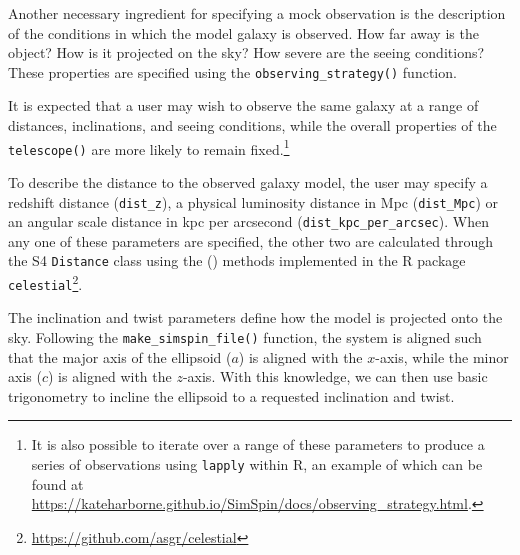 \documentclass[
  journal=pasa,
  manuscript=research-paper, %
  year=2020,
  volume=37,
]{cup-journal}
\newcommand{\citetoggle}[1]{\citeauthor{#1} (\citeyear{#1})}
\newcommand{\makesimspinfile}[1]{\texttt{make\_simspin\_file()}#1}
\newcommand{\telescope}[1]{\texttt{telescope()}#1}
\newcommand{\observingstrategy}[1]{\texttt{observing\_strategy()}#1}
\begin{document}
Another necessary ingredient for specifying a mock observation is the description of the conditions in which the model galaxy is observed.
How far away is the object? 
How is it projected on the sky? 
How severe are the seeing conditions?
These properties are specified using the \observingstrategy{} function. 

It is expected that a user may wish to observe the same galaxy at a range of distances, inclinations, and seeing conditions, while the overall properties of the \telescope{} are more likely to remain fixed.\footnote{It is also possible to iterate over a range of these parameters to produce a series of observations using \texttt{lapply} within R, an example of which can be found at \url{https://kateharborne.github.io/SimSpin/docs/observing_strategy.html}.}

To describe the distance to the observed galaxy model, the user may specify a redshift distance (\texttt{dist\_z}), a physical luminosity distance in Mpc (\texttt{dist\_Mpc}) or an angular scale distance in kpc per arcsecond (\texttt{dist\_kpc\_per\_arcsec}).
When any one of these parameters are specified, the other two are calculated through the S4 \texttt{Distance} class using the  \citetoggle{Hogg1999DistanceCosmology} methods implemented in the R package \texttt{celestial}\footnote{\url{https://github.com/asgr/celestial}}.


The inclination and twist parameters define how the model is projected onto the sky. 
Following the \makesimspinfile{} function, the system is aligned such that the major axis of the ellipsoid ($a$) is aligned with the $x$-axis, while the minor axis ($c$) is aligned with the $z$-axis. 
With this knowledge, we can then use basic trigonometry to incline the ellipsoid to a requested inclination and twist.
\end{document}
